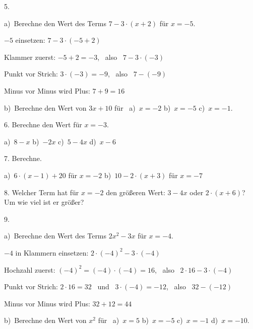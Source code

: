 \documentclass[11pt]{article}
\newcommand{\grau}[1]{{\color{mbgrau}#1}}
\begin{document}
\begin{pfaufg}{}{5.}{}
\grau{a)\ Berechne den Wert des Terms $7 - 3 \cdot (x + 2)$ für $x = -5$.\par\smallskip $-5$ einsetzen: \quad $7 - 3 \cdot (-5 + 2)$\par Klammer zuerst: \quad $-5 + 2 = -3$, \ also \ $7 - 3 \cdot (-3)$\par Punkt vor Strich: \quad $3 \cdot (-3) = -9$, \ also \ $7 - (-9)$\par Minus vor Minus wird Plus: \quad $7 + 9 = 16$}
\par\medskip
b)\ Berechne den Wert von $3x + 10$ für \ a)~$x = -2$ \qquad b)~$x = -5$ \qquad c)~$x = -1$.
\end{pfaufg}

\begin{pfaufg}{}{6.}{}
Berechne den Wert für $x = -3$. \par\vspace{3pt} a)~$8 - x$ \qquad b)~$-2x$ \qquad c)~$5 - 4x$ \qquad d)~$x - 6$
\end{pfaufg}

\begin{pfaufg}{}{7.}{}
Berechne. \par\vspace{3pt} a)~$6 \cdot (x - 1) + 20$ für $x = -2$ \qquad b)~$10 - 2 \cdot (x + 3)$ für $x = -7$
\end{pfaufg}

\begin{pfaufg}{}{8.}{}
Welcher Term hat für $x = -2$ den größeren Wert: $3 - 4x$ oder $2 \cdot (x + 6)$? Um wie viel ist er größer?
\end{pfaufg}

\begin{pfaufg}{}{9.}{}
\grau{a)\ Berechne den Wert des Terms $2x^2 - 3x$ für $x = -4$.\par\smallskip $-4$ in Klammern einsetzen: \quad $2 \cdot (-4)^2 - 3 \cdot (-4)$\par Hochzahl zuerst: \quad $(-4)^2 = (-4) \cdot (-4) = 16$, \ also \ $2 \cdot 16 - 3 \cdot (-4)$\par Punkt vor Strich: \quad $2 \cdot 16 = 32$ \ und \ $3 \cdot (-4) = -12$, \ also \ $32 - (-12)$\par Minus vor Minus wird Plus: \quad $32 + 12 = 44$}
\par\medskip
b)\ Berechne den Wert von $x^2$ für \ a)~$x = 5$ \qquad b)~$x = -5$ \qquad c)~$x = -1$ \qquad d)~$x = -10$.
\end{pfaufg}
\end{document}
